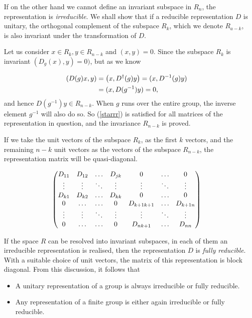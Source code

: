 If on the other hand we cannot define an invariant subspace in $R_n$,
the representation is \emph{irreducible}. We shall show that if a reducible
representation $D$ is unitary, the orthogonal complement of the subspace $R_k$,
which we denote $R_{a-k}$, is also invariant under the transformation of $D$.

Let us consider $x\in R_k,y\in R_{n-k}$ and $(x,y)=0$. Since the subspace $R_k$
is invariant $(D_g(x),y)=0)$, but as we know

\begin{align}
    \qty(D(g)x,y)&=\qty(x,D^\dagger(g)y)=(x,D^{-1}(g)y)\\
                 &=(x,D(g^{-1})y)=0\label{starrr},
\end{align}
and hence $D(g^{-1})y\in R_{n-k}$. When $g$ runs over the entire group,
the inverse element $g^{-1}$ will also do so. So (\autoref{starrr}) is satisfied
for all matrices of the representation in question, and the invariance $R_{n-k}$
is proved.

If we take the unit vectors of the subspace $R_k$, as the first $k$ vectors, and 
the remaining $n-k$ unit vectors as the vectors of the subspace $R_{n-k}$, the
representation matrix will be quasi-diagonal.

\begin{align}
    \mqty(D_{11} & D_{12} & \dots & D_{jk} & 0 & \dots & 0\\
    \vdots & \vdots & \ddots & \vdots & \vdots & \ddots & \vdots \\
    D_{k1} & D_{k2} & \dots & D_{kk} & 0 & \dots & 0\\
    0 & \dots & \dots & 0 & D_{k+1 k+1} & \dots & D_{k+1n}\\
    \vdots & \vdots & \ddots & \vdots & \vdots & \ddots & \vdots\\
    0 & \dots & \dots & 0 & D_{nk+1} & \dots &D_{nn}
    )
\end{align}

If the space $R$ can be resolved into invariant subspaces, in each of them an
irreducible representation is realised, then the representation $D$ is
\emph{fully reducible}. With a suitable choice of unit vectors, the matrix of
this representation is block diagonal. From this discussion, it follows that

\begin{itemize}
    \item A unitary representation of a group is always irreducible or fully
        reducible.
    \item Any representation of a finite group is either again irreducible or
        fully reducible.
\end{itemize}

